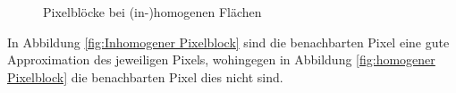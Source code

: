 \begin{figure}[H]
    \caption{Pixelblöcke bei (in-)homogenen Flächen}\label{fig:Pixelblöcke}
\end{figure}

In Abbildung \ref{fig:Inhomogener Pixelblock} sind die benachbarten Pixel eine gute 
Approximation des jeweiligen Pixels, wohingegen in Abbildung \ref{fig:homogener Pixelblock}
die benachbarten Pixel dies nicht sind.